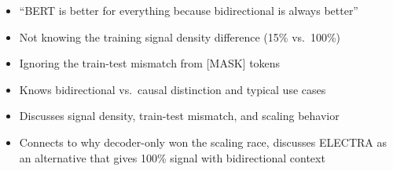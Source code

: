 \begin{interviewq}
\redflags
\begin{itemize}
    \item ``BERT is better for everything because bidirectional is always better''
    \item Not knowing the training signal density difference (15\% vs.\ 100\%)
    \item Ignoring the train-test mismatch from [MASK] tokens
\end{itemize}


\goodgreat
\begin{itemize}
    \item {} Knows bidirectional vs.\ causal distinction and typical use cases
    \item {} Discusses signal density, train-test mismatch, and scaling behavior
    \item {} Connects to why decoder-only won the scaling race, discusses ELECTRA as an alternative that gives 100\% signal with bidirectional context
\end{itemize}

\end{interviewq}

